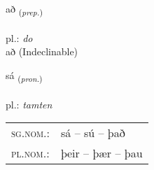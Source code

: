 \documentclass[frontgrid, backgrid]{flacards}\usepackage[]{graphicx}\usepackage[]{xcolor}
\begin{document}
\renewcommand{\blhead}{\vskip5pt {\small\bfseries\footnotesize Forsetning | Preposition }}
\renewcommand{\bcfoot}{\vskip5pt \hspace{2pt}{\small\bfseries\footnotesize 1K}}


{að \small{\textsubscript{(\textit{prep.})}} \\[1ex]
\textphonetic{[aːð]} \\
pl.: \emph{do} \\  [2ex]
að (Indeclinable)}

\renewcommand{\flhead}{\vskip5pt \fboxsep=0pt {\small\bfseries\footnotesize Fornafn | Pronoun}}
\renewcommand{\fcfoot}{\vskip5pt \fboxsep=0pt \hspace{2pt}{\small\bfseries\footnotesize 1K}}

\renewcommand{\blhead}{\vskip5pt {\small\bfseries\footnotesize Fornafn | Pronoun }}
\renewcommand{\bcfoot}{\vskip5pt \hspace{2pt}{\small\bfseries\footnotesize 1K}}


{sá \small{\textsubscript{(\textit{pron.})}} \\[1ex] %
\textphonetic{[sauː]} \\
pl.: \emph{tamten} \\  [2ex]
\renewcommand*{\arraystretch}{0.8}
\begin{tabular}{ll}
\textsc{sg.nom.}: & sá  --  sú -- það \\ 
\textsc{pl.nom.}: & þeir -- þær -- þau
\end{tabular}
}

\renewcommand{\flhead}{\vskip5pt \fboxsep=0pt {\small\bfseries\footnotesize Sagnorð | Verb}}
\renewcommand{\fcfoot}{\vskip5pt \fboxsep=0pt \hspace{2pt}{\small\bfseries\footnotesize 1K}}

\renewcommand{\blhead}{\vskip5pt {\small\bfseries\footnotesize Sagnorð | Verb }}
\renewcommand{\bcfoot}{\vskip5pt \hspace{2pt}{\small\bfseries\footnotesize 1K}}
\end{document}
